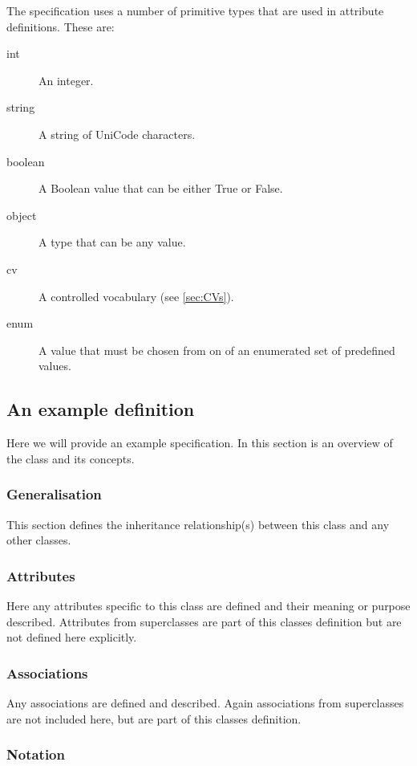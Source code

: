 The specification uses a number of primitive types that are used in
attribute definitions. These are:
\begin{description}
\item[int] An integer.
\item[string] A string of UniCode characters.
\item[boolean] A Boolean value that can be either True or False.
\item[object] A type that can be any value.
\item[cv] A controlled vocabulary (see \ref{sec:CVs}).
\item[enum] A value that must be chosen from on of an enumerated set
  of predefined values.
\end{description}


\subsection{An example definition}

Here we will provide an example specification. In this section is an
overview of the class and its concepts.

\subsubsection{Generalisation}

This section defines the inheritance relationship(s) between this
class and any other classes.

\subsubsection{Attributes}

Here any attributes specific to this class are defined and their
meaning or purpose described. Attributes from superclasses are part of
this classes definition but are not defined here explicitly.

\subsubsection{Associations}

Any associations are defined and described. Again associations from
superclasses are not included here, but are part of this classes definition.

\subsubsection{Notation}

